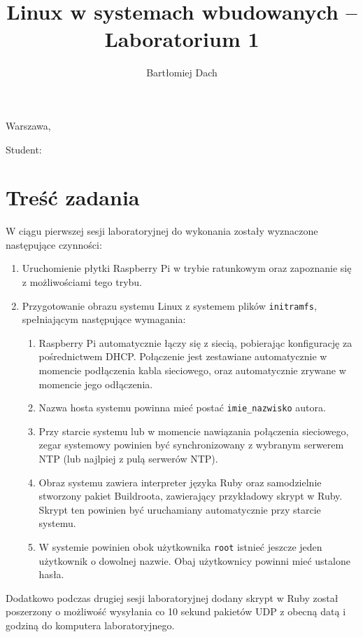 \documentclass[10pt,a4paper]{article}
\title{Linux w systemach wbudowanych -- Laboratorium 1}
\author{Bartłomiej Dach}
\begin{document}
\makeatletter
\begin{flushright}
	Warszawa, \@date
\end{flushright}
\begin{center}
	\LARGE{\@title}
\end{center}
\vspace{0.25cm}
Student: \@author
\makeatother

\section{Treść zadania}

W ciągu pierwszej sesji laboratoryjnej do wykonania zostały wyznaczone następujące czynności:

\begin{enumerate}
	\item Uruchomienie płytki Raspberry Pi w trybie ratunkowym oraz zapoznanie się z możliwościami tego trybu.
	\item Przygotowanie obrazu systemu Linux z systemem plików \verb+initramfs+, spełniającym następujące wymagania:
	\begin{enumerate}
		\item Raspberry Pi automatycznie łączy się z siecią, pobierając konfigurację za pośrednictwem DHCP.
			Połączenie jest zestawiane automatycznie w momencie podłączenia kabla sieciowego, oraz automatycznie
			zrywane w momencie jego odłączenia.
		\item Nazwa hosta systemu powinna mieć postać \verb+imie_nazwisko+ autora.
		\item Przy starcie systemu lub w momencie nawiązania połączenia sieciowego, zegar systemowy powinien być 
			synchronizowany z wybranym serwerem NTP (lub najlpiej z pulą serwerów NTP).
		\item Obraz systemu zawiera interpreter języka Ruby oraz samodzielnie stworzony pakiet Buildroota, zawierający przykładowy
			skrypt w Ruby. Skrypt ten powinien być uruchamiany automatycznie przy starcie systemu.
		\item W systemie powinien obok użytkownika \verb+root+ istnieć jeszcze jeden użytkownik o dowolnej nazwie.
			Obaj użytkownicy powinni mieć ustalone hasła.
	\end{enumerate}
\end{enumerate}

Dodatkowo podczas drugiej sesji laboratoryjnej dodany skrypt w Ruby został poszerzony o możliwość wysyłania co 10 sekund pakietów UDP z obecną datą i godziną do komputera laboratoryjnego.
\end{document}

